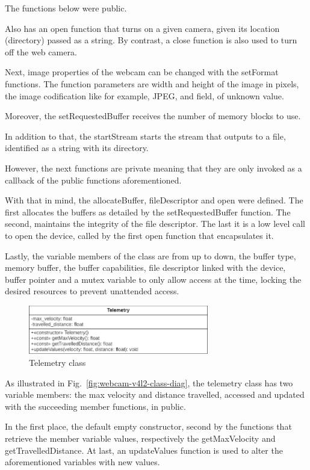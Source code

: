 The functions below were public.

Also has an open function that turns on a given camera, given its location (directory) passed as a string. By contrast, a close function is also used to turn off the web camera.

Next, image properties of the webcam can be changed with the setFormat functions. The function parameters are width and height of the image in pixels, the image codification like for example, JPEG, and field, of unknown value.

Moreover, the setRequestedBuffer receives the number of memory  blocks to use.

In addition to that, the startStream starts the stream that outputs to a file, identified as a string with its directory.

However, the next functions are private meaning that they are only invoked as a callback of the public functions aforementioned.

With that in mind, the allocateBuffer, fileDescriptor and open were defined. The first allocates the buffers as detailed by the setRequestedBuffer function. The second, maintains the integrity of the file descriptor. The last it is a low level call to open the device, called by the first open function that encapsulates it.

Lastly, the variable members of the class are from up to down, the buffer type, memory buffer, the buffer capabilities, file descriptor linked with the device, buffer pointer and a mutex variable to only allow access at the time, locking the desired resources to prevent unattended access.
%
\begin{figure}[!hbt]
\centering
    \includegraphics[width=0.7\textwidth]{./img/telemetry_classdiag.png}
  \caption{Telemetry class}%
\label{fig:telemetry-classdiag}
\end{figure}
%
As illustrated in Fig.~\ref{fig:webcam-v4l2-class-diag}, the telemetry class has two variable members: the max velocity and distance travelled, accessed and updated with the succeeding member functions, in public.

In the first place, the default empty constructor, second by the functions that retrieve the member variable values, respectively the getMaxVelocity and getTravelledDistance. At last, an updateValues function is used to alter the aforementioned variables with new values.
%

